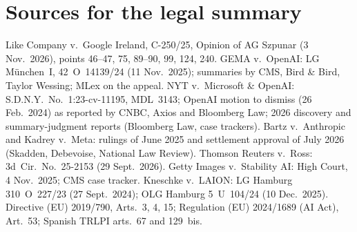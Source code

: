 \documentclass[10pt,a4paper]{article}
\begin{document}
\section*{Sources for the legal summary}
\small
Like Company v.\ Google Ireland, C-250/25, Opinion of AG Szpunar (3 Nov.\ 2026), points 46--47, 75, 89--90, 99,
124, 240. GEMA v.\ OpenAI: LG M\"unchen~I, 42~O~14139/24 (11 Nov.\ 2025); summaries by CMS, Bird \& Bird, Taylor Wessing; MLex on
the appeal. NYT v.\ Microsoft \& OpenAI: S.D.N.Y.\ No.~1:23-cv-11195, MDL~3143; OpenAI motion to dismiss (26 Feb.\
2024) as reported by CNBC, Axios and Bloomberg Law; 2026 discovery and summary-judgment reports (Bloomberg Law, case
trackers). Bartz v.\ Anthropic and Kadrey v.\ Meta: rulings of June 2025 and settlement approval of July 2026
(Skadden, Debevoise, National Law Review). Thomson Reuters v.\ Ross: 3d~Cir.\ No.~25-2153 (29 Sept.\ 2026). Getty
Images v.\ Stability AI: High Court, 4 Nov.\ 2025; CMS case tracker. Kneschke v.\ LAION: LG Hamburg 310~O~227/23 (27
Sept.\ 2024); OLG Hamburg 5~U~104/24 (10 Dec.\ 2025). Directive (EU) 2019/790, Arts.~3, 4, 15; Regulation (EU)
2024/1689 (AI Act), Art.~53; Spanish TRLPI arts.~67 and 129~bis.
\end{document}
